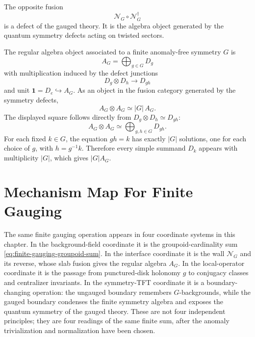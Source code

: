 The opposite fusion
\[
  \mathcal N_G\circ\mathcal N_G^\dagger
\]
is a defect of the gauged theory.  It is the algebra object generated by the
quantum symmetry defects acting on twisted sectors.

\begin{definition}
\label{def:regular-algebra-defect}
The regular algebra object associated to a finite anomaly-free symmetry \(G\)
is
\[
  A_G=\bigoplus_{g\in G}D_g
\]
with multiplication induced by the defect junctions
\[
  D_g\otimes D_h\longrightarrow D_{gh}
\]
and unit \(\mathbf 1=D_e\hookrightarrow A_G\).  As an object in the fusion
category generated by the symmetry defects,
\begin{equation}
  A_G\otimes A_G\simeq |G|\,A_G .
  \label{eq:regular-algebra-square}
\end{equation}
The displayed square follows directly from \(D_g\otimes D_h\simeq D_{gh}\):
\[
  A_G\otimes A_G
  \simeq
  \bigoplus_{g,h\in G}D_{gh}.
\]
For each fixed \(k\in G\), the equation \(gh=k\) has exactly \(|G|\)
solutions, one for each choice of \(g\), with \(h=g^{-1}k\).  Therefore every
simple summand \(D_k\) appears with multiplicity \(|G|\), which gives
\(|G|A_G\).
\end{definition}

\section{Mechanism Map For Finite Gauging}
\label{sec:finite-gauging-mechanism-map}

The same finite gauging operation appears in four coordinate systems in this
chapter.  In the background-field coordinate it is the groupoid-cardinality sum
\eqref{eq:finite-gauging-groupoid-sum}.  In the interface coordinate it is the
wall \(\mathcal N_G\) and its reverse, whose slab fusion gives the regular
algebra \(A_G\).  In the local-operator coordinate it is the passage from
punctured-disk holonomy \(g\) to conjugacy classes and centralizer invariants.
In the symmetry-TFT coordinate it is a boundary-changing operation: the
ungauged boundary remembers \(G\)-backgrounds, while the gauged boundary
condenses the finite symmetry algebra and exposes the quantum symmetry of the
gauged theory.  These are not four independent principles; they are four
readings of the same finite sum, after the anomaly trivialization and
normalization have been chosen.

